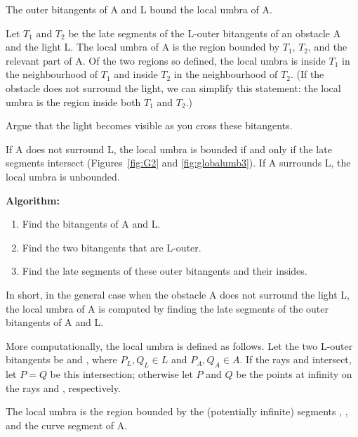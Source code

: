 \documentclass[12pt]{article}
\begin{document}
The outer bitangents of A and L bound the local umbra of A.

\begin{theorem}
\label{thm:localumbra}
Let $T_1$ and $T_2$ be the late segments of the L-outer bitangents
of an obstacle A and the light L.
The local umbra of A is the region bounded by $T_1$, $T_2$, and 
the relevant part of A.
Of the two regions so defined, the local umbra is inside $T_1$ in the
neighbourhood of $T_1$ and inside $T_2$ in the neighbourhood of $T_2$.
(If the obstacle does not surround the light, we can simplify
this statement:
the local umbra is the region inside both $T_1$ and $T_2$.)
\end{theorem}
\prf
Argue that the light becomes visible as you cross these bitangents.
\QED

If A does not surround L,
the local umbra is bounded if and only if the late segments intersect
(Figures~\ref{fig:G2} and \ref{fig:globalumb3}).
If A surrounds L,
the local umbra is unbounded.

\vspace{.1in}

{\bf Algorithm:}
\begin{enumerate}
\item Find the bitangents of A and L.
\item Find the two bitangents that are L-outer.
\item Find the late segments of these outer bitangents and their insides.
\end{enumerate}

In short, in the general case when the obstacle A does not surround the light L,
the local umbra of A is computed by finding the late segments of
the outer bitangents of A and L.


\begin{rmk}
More computationally, the local umbra is defined as follows.
Let the two L-outer bitangents be  and ,
where $P_L,Q_L \in L$ and $P_A,Q_A \in A$.
If the rays  and  intersect,
let $P=Q$ be this intersection;
otherwise let $P$ and $Q$ be the points 
at infinity on the rays  and , respectively.

The local umbra is the region bounded by the (potentially infinite)
segments , ,
and the curve segment  of A.
\end{rmk}
\end{document}
